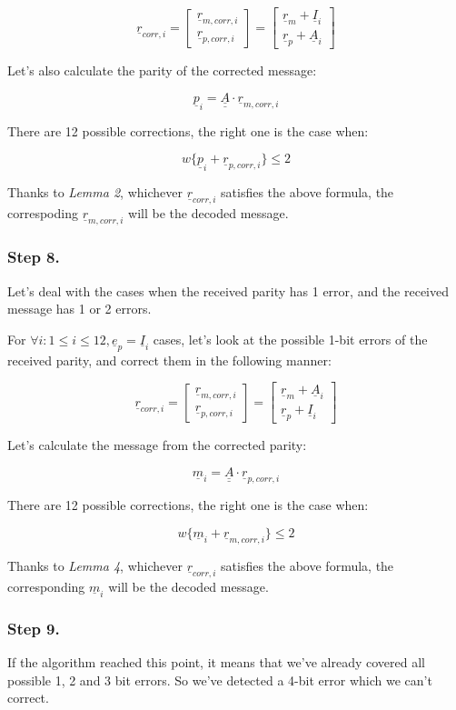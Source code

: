 \documentclass[11pt,a4paper,oneside]{report}             %
\def\doubleunderline#1{\underline{\underline{#1}}}
\def\dul#1{\doubleunderline{#1}}
\def\ul#1{\underline{#1}}
\newcommand{\vect}[2]{\begin{bmatrix} #1 \\ #2 \end{bmatrix}}
\begin{document}
\[
    \ul{r}_{corr, i} = \vect{\ul{r}_{m, corr, i}}{\ul{r}_{p, corr, i}} = \vect{\ul{r}_m + \ul{I}_i}{\ul{r}_p + \ul{A}_i}
\]

Let's also calculate the parity of the corrected message:

\[
    \ul{p}_{i} = \dul{A} \cdot \ul{r}_{m, corr, i}
\]

There are 12 possible corrections, the right one is the case when:

\[
    w\{\ul{p}_{i} + \ul{r}_{p, corr, i}\} \leq 2
\]

Thanks to \emph{Lemma 2}, whichever $\ul{r}_{corr, i}$ satisfies the above formula, the correspoding $\ul{r}_{m, corr, i}$ will be
the decoded message.

\subsubsection{Step 8.}

Let's deal with the cases when the received parity has 1 error, and the received message has 1 or 2 errors.

For $\forall i : 1 \leq i \leq 12, \ul{e}_p = \ul{I}_i$ cases, let's look at the possible 1-bit errors of the
received parity, and correct them in the following manner:

\[
    \ul{r}_{corr, i} = \vect{\ul{r}_{m, corr, i}}{\ul{r}_{p, corr, i}} = \vect{\ul{r}_m + \ul{A}_i}{\ul{r}_p + \ul{I}_i}
\]

Let's calculate the message from the corrected parity:

\[
    \ul{m}_{i} = \dul{A} \cdot \ul{r}_{p, corr, i}
\]

There are 12 possible corrections, the right one is the case when:

\[
    w\{\ul{m}_{i} + \ul{r}_{m, corr, i}\} \leq 2
\]

Thanks to \emph{Lemma 4}, whichever $\ul{r}_{corr, i}$ satisfies the above formula, the corresponding $\ul{m}_{i}$  will be
the decoded message.

\subsubsection{Step 9.}

If the algorithm reached this point, it means that we've already covered all possible 1, 2 and 3 bit errors.
So we've detected a 4-bit error which we can't correct.
\end{document}
